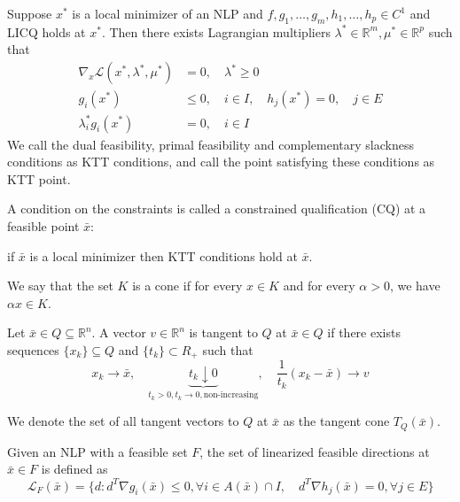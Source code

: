 \begin{theorem}
    Suppose $x^*$ is a local minimizer of an NLP and $f,g_1,\ldots,g_m,h_1,\ldots,h_p \in C^1$ and LICQ holds at $x^*$. Then there exists Lagrangian multipliers $\lambda^* \in \mathbb R^m, \mu^* \in \mathbb R^p$ such that
    \begin{align*}
        \nabla_x \mathcal L(x^*, \lambda^*, \mu^*) &= 0, \quad \lambda^* \geq 0 \tag*{Dual feasibility} \\
        g_i(x^*) &\leq 0, \quad i \in I, \quad h_j(x^*) = 0, \quad j \in E \tag*{Primal feasibility} \\
        \lambda^*_i g_i(x^*) &= 0, \quad i \in I \tag*{Complementary slackness}
    \end{align*}
    We call the dual feasibility, primal feasibility and complementary slackness conditions as KTT conditions, and call the point satisfying these conditions as KTT point.
\end{theorem}
\begin{definition}
    A condition on the constraints is called a constrained qualification (CQ) at a feasible point $\bar x$:

    if $\bar x$ is a local minimizer then KTT conditions hold at $\bar x$.
\end{definition}
\begin{definition}[Cone]
    We say that the set $K$ is a cone if for every $x \in K$ and for every $\alpha > 0$, we have $\alpha x \in K$.
\end{definition}
\begin{definition}
    Let $\bar x \in Q \subseteq \mathbb R^n$. A vector $v \in \mathbb R^n$ is tangent to $Q$ at $\bar x \in Q$ if there exists sequences $\{x_k\}\subseteq Q$ and $\{t_k\} \subset R_+$ such that $$x_k \to \bar x, \quad \underbrace{t_k \downarrow 0}_{t_k > 0, t_k \to 0, \text{non-increasing}}, \quad \frac{1}{t_k}(x_k - \bar x) \to v$$
\end{definition}
\begin{definition}
    We denote the set of all tangent vectors to $Q$ at $\bar x$ as the tangent cone $T_Q(\bar x)$.
\end{definition}
\begin{definition}
    Given an NLP with a feasible set $F$, the set of linearized feasible directions at $\bar x \in F$ is defined as 
    $$\mathcal L_F(\bar x) = \{d: d^T \nabla g_i(\bar x) \leq 0, \forall i \in A(\bar x) \cap I, \quad d^T \nabla h_j(\bar x) = 0, \forall j \in E\}$$
\end{definition}
